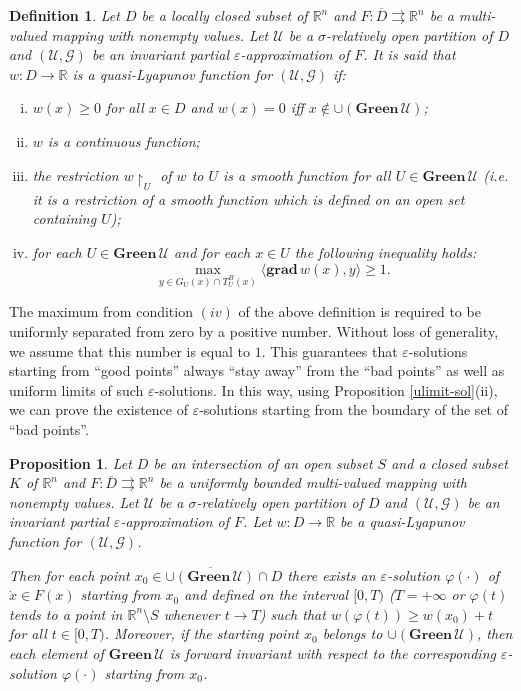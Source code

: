 \documentclass[a4paper]{article}
\newtheorem{prop}[thm]{Proposition}
\newtheorem{definition}[thm]{Definition}
\begin{document}
\begin{definition}\label{quasilyapunov}
    Let $D$ be a locally closed subset of $\mathbb{R}^n$ and $F: \overline{D} \rightrightarrows \mathbb{R}^n$ be a multi-valued mapping with nonempty values. Let $\mathcal{U}$ be a $\sigma$-relatively open partition of $D$ and $(\mathcal{U},\mathcal{G})$ be an invariant partial $\varepsilon$-approximation of $F$. It is said that $w: D \to \mathbb{R}$ is a quasi-Lyapunov function for $(\mathcal{U},\mathcal{G})$ if:
    \begin{enumerate}[(i)]
        \item $w(x) \ge 0$ for all $x \in D$ and $w(x) = 0$ iff $x \notin \cup(\mathbf{Green} \,\mathcal{U})$;
        \item $w$ is a continuous function;
        \item the restriction $w\!\restriction_{U}$ of $w$ to $U$ is a smooth function for all $U \in \mathbf{Green} \,\mathcal{U}$ (i.e. it is a restriction of a smooth function which is defined on an open set containing $U$);
        \item for each $U \in \mathbf{Green} \,\mathcal{U}$ and for each $x \in U$ the following inequality holds: $$\max_{y \in G_U(x) \cap T^B_{U}(x)} \langle \mathbf{grad} \, w(x) , y \rangle \ge 1.$$
    \end{enumerate}
\end{definition}

The maximum from condition $(iv)$ of the above definition is required to be uniformly separated from zero by a positive number. Without loss of generality, we assume that this number is equal to $1$. This guarantees that $\varepsilon$-solutions starting from ``good points'' always ``stay away'' from the ``bad points'' as well as uniform limits of such $\varepsilon$-solutions. In this way, using Proposition \ref{ulimit-sol}(ii), we can prove the existence of $\varepsilon$-solutions starting from the boundary of the set of ``bad points''.

\begin{prop}\label{esolution}
    Let $D$ be an intersection of an open subset $S$ and a closed subset $K$ of $\mathbb{R}^n$ and $F : \overline{D} \rightrightarrows \mathbb{R}^n$ be a uniformly bounded multi-valued mapping with nonempty values.
    Let $\mathcal{U}$ be a $\sigma$-relatively open partition of $D$ and $(\mathcal{U},\mathcal{G})$ be an invariant partial $\varepsilon$-approximation of $F$. Let $w: D \to \mathbb{R}$ be a quasi-Lyapunov function for $(\mathcal{U},\mathcal{G})$.

    Then for each point $x_0 \in \overline{\cup(\mathbf{Green} \,\mathcal{U})} \cap D$ there exists an $\varepsilon$-solution $\varphi(\cdot)$ of $\dot{x} \in F(x)$ starting from $x_0$ and defined on the interval $[0,T)$ ($T=+\infty$ or $\varphi(t)$ tends to a point in $\mathbb{R}^n \setminus S$ whenever $t \to T$) such that $w(\varphi(t)) \ge w(x_0) + t$ for all $t \in [0,T)$. Moreover, if the starting point $x_0$ belongs to $\cup(\mathbf{Green} \,\mathcal{U})$, then each element of $\mathbf{Green} \,\mathcal{U}$ is forward invariant with respect to the corresponding $\varepsilon$-solution $\varphi(\cdot)$ starting from $x_0$.
\end{prop}
\end{document}
